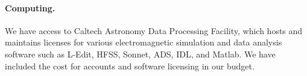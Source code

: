 \paragraph{Computing.} We have access to Caltech Astronomy Data Processing Facility, which hosts and maintains licenses for
various electromagnetic simulation and data analysis software such as L-Edit, HFSS, Sonnet,
ADS, IDL, and Matlab. We have included the cost for accounts and software licensing in our
budget.


% 
% 
% 
% 
% 

